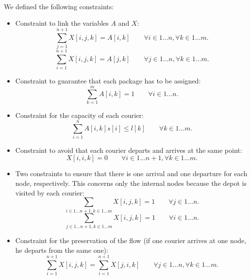 We defined the following constraints:
\begin{itemize}
    \item Constraint to link the variables $A$ and $X$:
    \begin{equation}
        \sum_{j = 1}^{n+1} X[i,j,k] = A[i,k]  \qquad  \forall i \in 1 \dots n,\forall k \in 1 \dots m.
    \end{equation}
    \begin{equation}
        \sum_{i = 1}^{n+1} X[i,j,k] = A[j,k]  \qquad  \forall j \in 1 \dots n,\forall k \in 1 \dots m.
    \end{equation}

    \item Constraint to guarantee that each package has to be assigned:
    \begin{equation}
        \sum_{k = 1}^{m} A[i,k] = 1  \qquad \forall i \in 1 \dots n.
    \end{equation}

    \item Constraint for the capacity of each courier:
    \begin{equation}
        \sum_{i = 1}^{n} A[i,k] s[i] \leq l[k] \qquad \forall k \in 1 \dots m.
    \end{equation}

    \item Constraint to avoid that each courier departs and arrives at the same point:
    \begin{equation}
        X[i,i,k] = 0 \qquad \forall i \in 1 \dots n+1, \forall k \in 1 \dots m.
    \end{equation}

    \item Two constraints to ensure that there is one arrival and one departure for each node, respectively. This concerns only the internal nodes because the depot is visited by each courier:
    \begin{equation}
        \sum_{i \in 1 \dots n+1, k \in 1 \dots m} X[i,j,k] = 1 \qquad \forall j \in 1 \dots n.  
    \end{equation}
    \begin{equation}
        \sum_{j \in 1 \dots n+1, k \in 1 \dots m} X[i,j,k] = 1 \qquad \forall i \in 1 \dots n.  
    \end{equation}

    \item Constraint for the preservation of the flow (if one courier arrives at one node, he departs from the same one):
    \begin{equation}
        \sum_{i = 1}^{n+1} X[i,j,k] = \sum_{i = 1}^{n+1} X[j,i,k] \qquad \forall j \in 1 \dots n, \forall k \in 1 \dots m.
    \end{equation}


\end{itemize}
